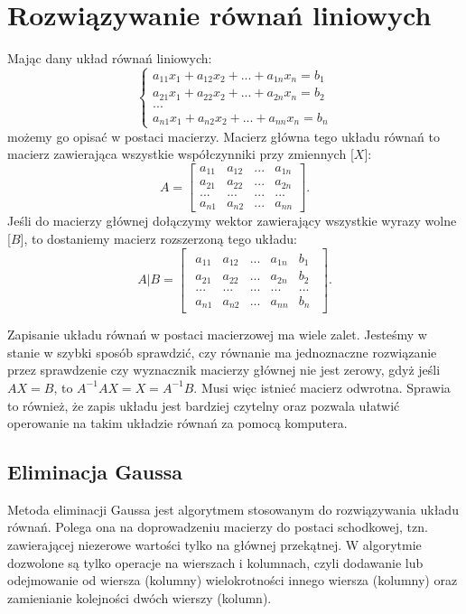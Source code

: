 \section{Rozwiązywanie równań liniowych}

Mając dany układ równań liniowych:
$$
\begin{cases}
    a_{11}x_1+a_{12}x_2+...+a_{1n}x_n=b_1\\
    a_{21}x_1+a_{22}x_2+...+a_{2n}x_n=b_2\\
    ...\\
    a_{n1}x_1+a_{n2}x_2+...+a_{nn}x_n=b_n
\end{cases}
$$
możemy go opisać w postaci macierzy. Macierz główna tego układu równań to macierz zawierająca wszystkie współczynniki przy zmiennych [$X$]:
$$A=\begin{bmatrix}
    a_{11}&a_{12}&...&a_{1n}\\
    a_{21}&a_{22}&...&a_{2n}\\
    ...&...&...&...\\
    a_{n1}&a_{n2}&...&a_{nn}
\end{bmatrix}.$$
Jeśli do macierzy głównej dołączymy wektor zawierający wszystkie wyrazy wolne [$B$], to dostaniemy macierz rozszerzoną tego układu:
$$
A|B=\begin{bmatrix}\begin{array}{cccc|c}
    a_{11}&a_{12}&...&a_{1n}&b_1\\
    a_{21}&a_{22}&...&a_{2n}&b_2\\
    ...&...&...&...&...\\
    a_{n1}&a_{n2}&...&a_{nn}&b_n
\end{array}\end{bmatrix}.
$$

Zapisanie układu równań w postaci macierzowej ma wiele zalet. Jesteśmy w stanie w szybki sposób sprawdzić, czy równanie ma jednoznaczne rozwiązanie przez sprawdzenie czy wyznacznik macierzy głównej nie jest zerowy, gdyż jeśli $AX=B$, to $A^{-1}AX=X=A^{-1}B$. Musi więc istnieć macierz odwrotna. Sprawia to również, że zapis układu jest bardziej czytelny oraz pozwala ułatwić operowanie na takim układzie równań za pomocą komputera.

\subsection{Eliminacja Gaussa}

Metoda eliminacji Gaussa jest algorytmem stosowanym do rozwiązywania układu równań. Polega ona na doprowadzeniu macierzy do postaci schodkowej, tzn. zawierającej niezerowe wartości tylko na głównej przekątnej. W algorytmie dozwolone są tylko operacje na wierszach i kolumnach, czyli dodawanie lub odejmowanie od wiersza (kolumny) wielokrotności innego wiersza (kolumny) oraz zamienianie kolejności dwóch wierszy (kolumn).


